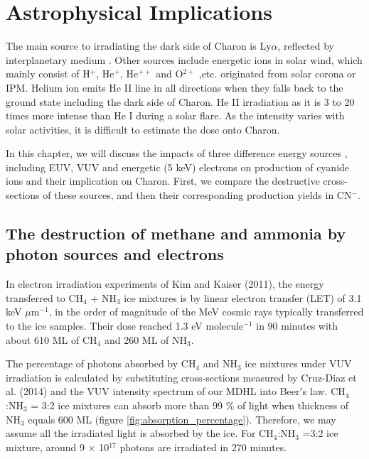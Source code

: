 \chapter{\protect Astrophysical Implications}
\label{astron}

The main source to irradiating the dark side of Charon is Ly$\alpha$, reflected by interplanetary medium \cite{grundy2016formation}. Other sources include energetic ions in solar wind, which mainly consist of H$^+$, He$^+$, He$^{++}$ and O$^{2+}$ ,etc. originated from solar corona or IPM. Helium ion emits He II line in all directions when they falls back to the ground state including the dark side of Charon. He II irradiation as it is 3 to 20 times more intense than He I during a solar flare. As the intensity varies with solar activities, it is difficult to estimate the dose onto Charon.

In this chapter, we will discuss the impacts of three difference energy sources , including EUV, VUV and energetic (5 keV) electrons on production of cyanide ions and their implication on Charon. First, we compare the destructive cross-sections of these sources, and then their corresponding production yields in CN$^-$.

\section{The destruction of methane and ammonia by photon sources and electrons}

In electron irradiation experiments of Kim and Kaiser (2011)\cite{kim}, the energy transferred to CH$_4$ + NH$_3$ ice mixtures is by linear electron transfer (LET) of 3.1 keV $\mu$m$^{-1}$, in the order of magnitude of the MeV cosmic rays typically transferred to the ice samples. Their dose reached 1.3 eV molecule$^{-1}$ in 90 minutes with about 610 ML of CH$_4$ and 260 ML of NH$_3$. 

The percentage of photons absorbed by CH$_4$ and NH$_3$ ice mixtures under VUV irradiation is calculated by substituting cross-sections measured by Cruz-Diaz et al. (2014) \cite{cruz2014vacuum} and the VUV intensity spectrum of our MDHL into Beer$'$s law. CH$_4$:NH$_3$ = 3:2 ice mixtures can absorb more than 99 \% of light when thickness of NH$_3$ equals 600 ML (figure \ref{fig:absorption_percentage}). Therefore, we may assume all the irradiated light is absorbed by the ice. For CH$_4$:NH$_3$ =3:2 ice mixture, around 9 $\times$ 10$^{17}$ photons are irradiated in 270 minutes.

